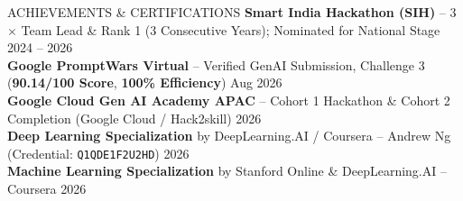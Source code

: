 \documentclass[letterpaper]{resume}
\begin{document}
\begin{rSection}{ACHIEVEMENTS \& CERTIFICATIONS}
\textbf{Smart India Hackathon (SIH)} -- 3$\times$ Team Lead \& Rank 1 (3 Consecutive Years); Nominated for National Stage \hfill 2024 -- 2026 \\
\textbf{Google PromptWars Virtual} -- Verified GenAI Submission, Challenge 3 (\textbf{90.14/100 Score}, \textbf{100\% Efficiency}) \hfill Aug 2026 \\
\textbf{Google Cloud Gen AI Academy APAC} -- Cohort 1 Hackathon \& Cohort 2 Completion (Google Cloud / Hack2skill) \hfill 2026 \\
\textbf{Deep Learning Specialization} by DeepLearning.AI / Coursera -- Andrew Ng (Credential: \texttt{Q1QDE1F2U2HD}) \hfill 2026 \\
\textbf{Machine Learning Specialization} by Stanford Online \& DeepLearning.AI -- Coursera \hfill 2026
\end{rSection}
\end{document}
